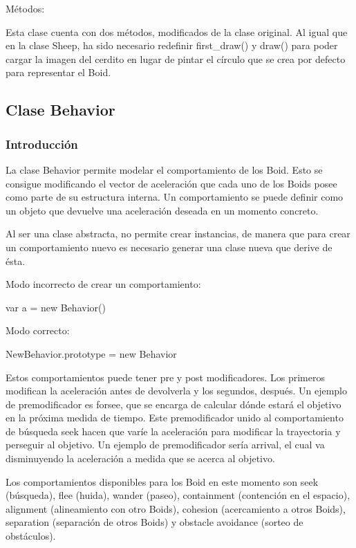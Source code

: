 Métodos:

Esta clase cuenta con dos métodos, modificados de la clase original. Al igual que en la clase Sheep, ha sido necesario redefinir 
first\_draw() y draw() para poder cargar la imagen del cerdito en lugar de pintar el círculo que se crea por defecto para representar el 
Boid.



\subsection{Clase Behavior}
\label{subsection:behavior_section}

\subsubsection{Introducción}
\label{subsubsection:behavior}

La clase Behavior permite modelar el comportamiento de los Boid. Esto se consigue modificando el vector de aceleración que cada uno de los 
Boids posee como parte de su estructura interna. Un comportamiento se puede definir como un objeto que devuelve una aceleración deseada en 
un momento concreto.

Al ser una clase abstracta, no permite crear instancias, de manera que para crear un comportamiento nuevo es necesario generar una clase 
nueva que derive de ésta.

Modo incorrecto de crear un comportamiento:

var a = new Behavior()

Modo correcto:

NewBehavior.prototype = new Behavior

Estos comportamientos puede tener pre y post modificadores. Los primeros modifican la aceleración antes de devolverla y los segundos,
después. Un ejemplo de premodificador es forsee, que se encarga de calcular dónde estará el objetivo en la próxima medida de tiempo. Este 
premodificador unido al comportamiento de búsqueda seek hacen que varíe la aceleración para modificar la trayectoria y perseguir al objetivo. 
Un ejemplo de premodificador sería arrival, el cual va disminuyendo la aceleración a medida que se acerca al objetivo.

Los comportamientos disponibles para los Boid en este momento son seek (búsqueda), flee (huida), wander (paseo), containment (contención 
en el espacio), alignment (alineamiento con otro Boids), cohesion (acercamiento a otros Boids), separation (separación de otros Boids) y 
obstacle avoidance (sorteo de obstáculos).

